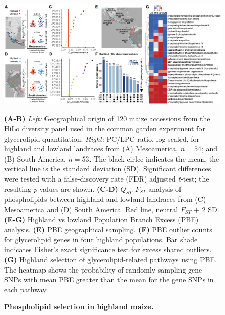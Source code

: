\begin{figure}[htp]
\includegraphics[width=\linewidth]{Chapter-1/figs/Fig_1.png}
\caption[Phospholipid selection in highland maize.]{\textbf{Phospholipid selection in highland maize.}} 
\textbf{(A-B)} \textit{Left:} Geographical origin of 120 maize accessions from the HiLo diversity panel used in the common garden experiment for glycerolipid quantitation.
\textit{Right:} PC/LPC ratio, log scaled, for highland and lowland landraces from (A) Mesoamerica, $n=54$; and (B) South America, $n=53$. The black cirlce indicates the mean, the vertical line is the standard deviation (SD). Significant differences were tested with a false-discovery rate (FDR) adjusted \textit{t}-test; the resulting \textit{p}-values are shown.
\textbf{(C-D)}
\textit{$Q_{ST}$-$F_{ST}$} analysis of phospholipids between highland and lowland landraces from (C) Mesoamerica  and (D) South America. 
Red line, neutral $F_{ST}$ + 2 SD.
\textbf{(E-G)} Highland vs lowland Population Branch Excess (PBE) analysis.
\textbf{(E)} PBE geographical sampling.
\textbf{(F)} PBE outlier counts for glycerolipid genes in four highland populations.
Bar shade indicates Fisher's exact significance test for excess shared outliers. 
\textbf{(G)} Highland selection of glycerolipid-related pathways using PBE. The heatmap shows the probability of randomly sampling gene SNPs with mean PBE greater than the mean for the gene SNPs in each pathway.
\label{Fig1}
\end{figure}


